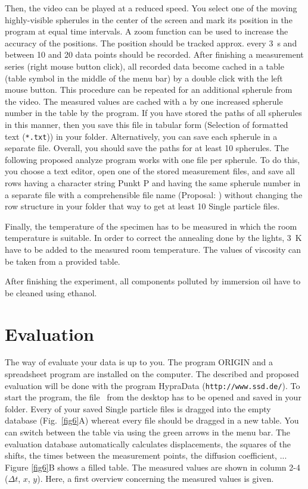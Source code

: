 \documentclass{tudphygp_eng}
\begin{document}
Then, the video can be played at a reduced speed. You select one of the moving highly-visible spherules in the center of the screen and mark its position in the program at equal time intervals. A zoom function can be used to increase the accuracy of the positions. The position should be tracked approx. every 3~s and between 10 and 20 data points should be recorded. After finishing a measurement series (right mouse button click), all recorded data become cached in a table (table symbol in the middle of the menu bar) by a double click with the left mouse button. This procedure can be repeated for an additional spherule from the video. The measured values are cached with a by one increased spherule number in the table by the program. If you have stored the paths of all spherules in this manner, then you save this file in tabular form (Selection of formatted text (\verb|*.txt|)) in your folder. Alternatively, you can save each spherule in a separate file. Overall, you should save the paths for at least 10 spherules. The following proposed analyze program works with one file per spherule. To do this, you choose a text editor, open one of the stored measurement files, and save all rows having a character string \grqq{}Punkt P\grqq{} and having the same spherule number in a separate file with a comprehensible file name (Proposal: \grqq) without changing the row structure in your folder that way to get at least 10 \grqq{}Single particle\grqq{} files. 

Finally, the temperature of the specimen has to be measured in which the room temperature is suitable. In order to correct the annealing done by the lights, 3~K have to be added to the measured room temperature. The values of viscosity can be taken from a provided table.

After finishing the experiment, all components polluted by immersion oil have to be cleaned using ethanol.

\section{Evaluation}

The way of evaluate your data is up to you. The program \grqq{}ORIGIN\grqq{} and a spreadsheet program are installed on the computer. The described and proposed evaluation will be done with the program HypraData (\verb|http://www.ssd.de/|). To start the program, the file \grqq\ from the desktop has to be opened and saved in your folder. Every of your saved \grqq{}Single particle\grqq{} files is dragged into the empty database (Fig.~\ref{fig6}A) whereat every file should be dragged in a new table. You can switch between the table via using the green arrows in the menu bar. The evaluation database automatically calculates displacements, the squares of the shifts, the times between the measurement points, the diffusion coefficient, ... Figure \ref{fig6}B shows a filled table. The measured values are shown in column 2-4 ($\Delta t$, $x$, $y$). Here, a first overview concerning the measured values is given.
\end{document}
